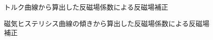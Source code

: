 \begin{figure}[hptb]
  \begin{center}
    
    \caption{トルク曲線から算出した反磁場係数による反磁場補正}
  \end{center}
\end{figure}

\begin{figure}[hptb]
  \begin{center}
    
    \caption{磁気ヒステリシス曲線の傾きから算出した反磁場係数による反磁場補正}
  \end{center}
\end{figure}